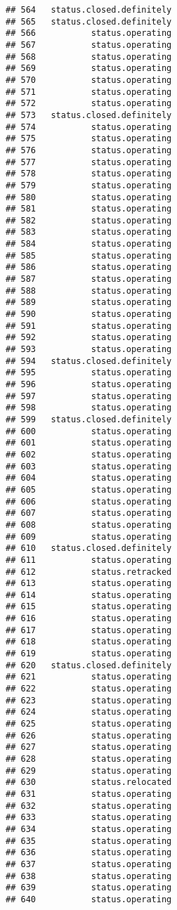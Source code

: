 \documentclass[
]{article}
\begin{document}
\begin{verbatim}
## 564   status.closed.definitely
## 565   status.closed.definitely
## 566           status.operating
## 567           status.operating
## 568           status.operating
## 569           status.operating
## 570           status.operating
## 571           status.operating
## 572           status.operating
## 573   status.closed.definitely
## 574           status.operating
## 575           status.operating
## 576           status.operating
## 577           status.operating
## 578           status.operating
## 579           status.operating
## 580           status.operating
## 581           status.operating
## 582           status.operating
## 583           status.operating
## 584           status.operating
## 585           status.operating
## 586           status.operating
## 587           status.operating
## 588           status.operating
## 589           status.operating
## 590           status.operating
## 591           status.operating
## 592           status.operating
## 593           status.operating
## 594   status.closed.definitely
## 595           status.operating
## 596           status.operating
## 597           status.operating
## 598           status.operating
## 599   status.closed.definitely
## 600           status.operating
## 601           status.operating
## 602           status.operating
## 603           status.operating
## 604           status.operating
## 605           status.operating
## 606           status.operating
## 607           status.operating
## 608           status.operating
## 609           status.operating
## 610   status.closed.definitely
## 611           status.operating
## 612           status.retracked
## 613           status.operating
## 614           status.operating
## 615           status.operating
## 616           status.operating
## 617           status.operating
## 618           status.operating
## 619           status.operating
## 620   status.closed.definitely
## 621           status.operating
## 622           status.operating
## 623           status.operating
## 624           status.operating
## 625           status.operating
## 626           status.operating
## 627           status.operating
## 628           status.operating
## 629           status.operating
## 630           status.relocated
## 631           status.operating
## 632           status.operating
## 633           status.operating
## 634           status.operating
## 635           status.operating
## 636           status.operating
## 637           status.operating
## 638           status.operating
## 639           status.operating
## 640           status.operating

\end{verbatim}
\end{document}
